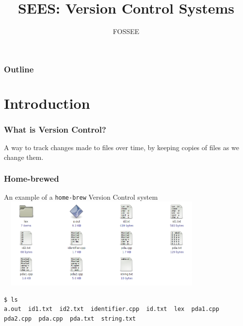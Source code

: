 \documentclass[14pt,compress]{beamer}
\title[Version Control Systems]{SEES: Version Control Systems}
\author[FOSSEE] {FOSSEE}
\institute[IIT Bombay] {Department of Aerospace Engineering\\IIT Bombay}
\date[]{}
\newcounter{time}
\newcommand{\typ}[1]{\lstinline{#1}}
\begin{document}
\begin{frame}
  \maketitle
\end{frame}

\begin{frame}
  \frametitle{Outline}
  \tableofcontents
\end{frame}


\section{Introduction}

\begin{frame}
  \frametitle{What is Version Control?}
  \begin{block}{}
    A way to track changes made to files over time, by keeping copies
    of files as we change them.
  \end{block}
\end{frame}

\begin{frame}[fragile]
  \frametitle{Home-brewed}
  \begin{center}
    An example of a \typ{home-brew} Version Control system
    \includegraphics[height=1.8in,width=4.2in]{images/folder.png}
  \end{center}
  \begin{lstlisting} 
$ ls
a.out  id1.txt  id2.txt  identifier.cpp  id.txt  lex  pda1.cpp  pda2.cpp  pda.cpp  pda.txt  string.txt
  \end{lstlisting} %
\end{frame}
\end{document}
